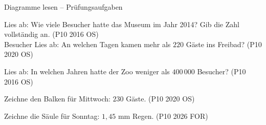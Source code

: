 \begin{aufgabe}{Diagramme lesen – Prüfungsaufgaben}
\begin{teile}
\teil Lies ab: Wie viele Besucher hatte das Museum im Jahr 2014? Gib die Zahl vollständig an. \hfill (P10 2016 OS) \\

\leerfeld Besucher
\teil Lies ab: An welchen Tagen kamen mehr als $220$ Gäste ins Freibad? \hfill (P10 2020 OS)

\teil Lies ab: In welchen Jahren hatte der Zoo weniger als $400\,000$ Besucher? \hfill (P10 2016 OS)

\teil Zeichne den Balken für Mittwoch: $230$ Gäste. \hfill (P10 2020 OS)

\teil Zeichne die Säule für Sonntag: $1{,}45$ mm Regen. \hfill (P10 2026 FOR)

\end{teile}
\end{aufgabe}

